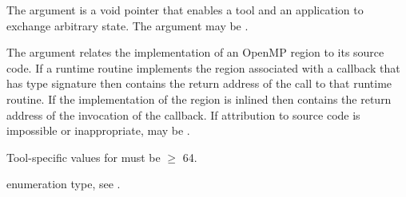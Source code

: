 The  argument is a void pointer that enables a tool and an application 
to exchange arbitrary state. The  argument may be .

The  argument relates the implementation of an OpenMP region
to its source code. If a runtime routine implements the region associated with
a callback that has type signature  then
 contains the return address of the call to that runtime routine.
If the implementation of the region is inlined then  contains the
return address of the invocation of the callback. If attribution to source code
is impossible or inappropriate,  may be .

\constraints
Tool-specific values for  must be $\geq$ 64.

\begin{crossrefs}
\item {} enumeration type, see .
\end{crossrefs}



